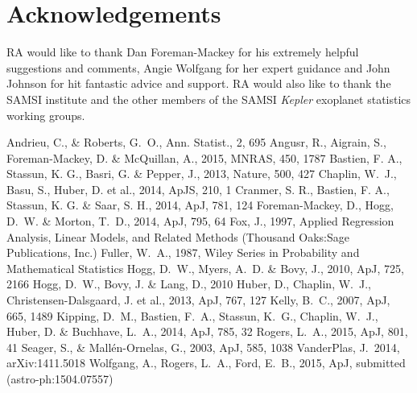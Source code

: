 \documentclass[apjl]{emulateapj}
\begin{document}
\acknowledgements
\section*{Acknowledgements}

RA would like to thank Dan Foreman-Mackey for his extremely helpful suggestions
and comments, Angie Wolfgang for her expert guidance and John Johnson for hit
fantastic advice and support.
RA would also like to thank the SAMSI institute and the other members of the
SAMSI {\it Kepler} exoplanet statistics working groups.


\begin{thebibliography}{99}
Andrieu, C., \& Roberts, G.~O., Ann. Statist., 2, 695
Angusr, R., Aigrain, S., Foreman-Mackey, D. \& McQuillan, A., 2015, MNRAS,
450, 1787
 Bastien,
F. A., Stassun, K. G., Basri, G. \& Pepper, J., 2013, Nature, 500, 427
Chaplin, W.~J., Basu, S., Huber, D. et al., 2014, ApJS, 210, 1
Cranmer, S. R., Bastien, F. A., Stassun, K. G. \& Saar, S. H., 2014, ApJ, 781,
124
 Foreman-Mackey, D., Hogg, D.~W. \& Morton, T.~D., 2014,
ApJ, 795, 64
Fox, J., 1997, Applied Regression Analysis, Linear Models, and Related Methods
(Thousand Oaks:Sage Publications, Inc.)
Fuller, W.~A., 1987, Wiley Series in Probability and Mathematical Statistics
Hogg, D.~W., Myers, A.~D. \& Bovy, J., 2010, ApJ, 725,
2166
Hogg, D.~W., Bovy, J. \& Lang, D., 2010
Huber, D., Chaplin, W.~J., Christensen-Dalsgaard, J. et al., 2013, ApJ, 767,
127
 Kelly, B.~C., 2007,
ApJ, 665, 1489
Kipping, D.~M., Bastien, F.~A., Stassun, K.~G., Chaplin, W.~J., Huber, D. \&
Buchhave, L.~A., 2014, ApJ, 785, 32
Rogers, L.~A., 2015, ApJ, 801, 41
Seager, S., \& Mall\'{e}n-Ornelas, G., 2003, ApJ, 585, 1038
VanderPlas, J.\ 2014, arXiv:1411.5018
Wolfgang, A., Rogers, L.~A., Ford, E.~B., 2015, ApJ, submitted
(astro-ph:1504.07557)
\end{thebibliography}
\end{document}
